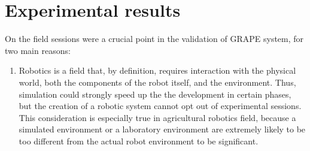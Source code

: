
\chapter{Experimental results} \label{chap:experimentalResults}

On the field sessions were a crucial point in the validation of \ac{GRAPE} system, for two main reasons:
\begin{enumerate}
	
	\item Robotics is a field that, by definition, requires interaction with the physical world, both the components of the robot itself, and the environment. Thus, simulation could strongly speed up the the development in certain phases, but the creation of a robotic system cannot opt out of experimental sessions. This consideration is especially true in agricultural robotics field, because a simulated environment or a laboratory environment are extremely likely to be too different from the actual robot environment to be significant.


\end{enumerate}
